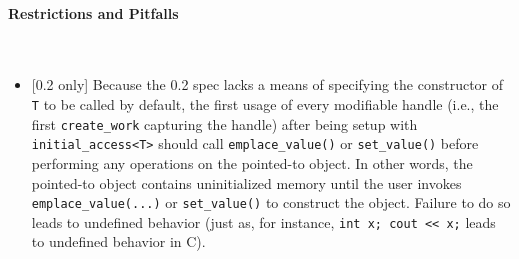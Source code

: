 \paragraph{Restrictions and Pitfalls}\mbox{}\\ 
\begin{itemize}
  \item {\color{red}[0.2 only]} Because the 0.2 spec lacks a means of specifying
  the constructor of \texttt{T} to be called by default, the first usage of
  every modifiable handle (i.e., the first {\texttt{create\_work}} capturing the
  handle) after being setup with \texttt{initial\_access<T>} should call
  \texttt{emplace\_value()} or \texttt{set\_value()} before performing any
  operations on the pointed-to object.  In other words, the pointed-to object
  contains uninitialized memory until the user invokes 
  \texttt{emplace\_value(...)} or \texttt{set\_value()} to construct the object.
  Failure to do so leads to undefined behavior (just as, for instance,
  \texttt{int x; cout << x;} leads to undefined behavior in C). 
\end{itemize}




